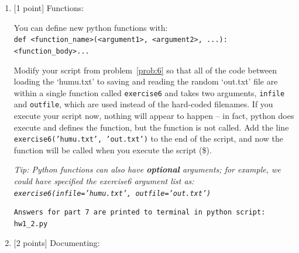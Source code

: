 \documentclass[10pt]{article}
\begin{document}
\begin{enumerate}
Also plot the original {\tt walk.txt} and your scaled version {\tt walk\_scale01.txt}.  To plot you can use the following very simple function that uses the matplotlib plot function:
\begin{verbatim}
import matplotlib.pyplot as plt

def plot_1d_array(arr):
    plt.figure()
    plt.plot(arr)
\end{verbatim}
Include these two plots, with appropriate captions, in your results (\$).

{\em Note: the shapes of the original {\tt walk.txt} and {\tt walk\_scale01.txt} should be identical, but the y-axis ranges should reflect the original and scaled ranges.}

{\bf Solution.} 

Answers for part 6 are printed to terminal in python script: hw1.py


\item \label{prob:7} [1 point]
Functions:

You can define new python functions with:\\
\hspace*{1cm} {\tt def <function\_name>(<argument1>, <argument2>, ...):}\\
\hspace*{1cm}\hspace{2em} {\tt <function\_body>...}

Modify your script from problem~\ref{prob:6} so that all of the code between loading the `humu.txt' to saving and reading the random `out.txt' file are within a single function called {\tt exercise6} and takes two arguments, {\tt infile} and {\tt outfile}, which are used instead of the hard-coded filenames.  If you execute your script now, nothing will appear to happen -- in fact, python does execute and defines the function, but the function is not called.  Add the line {\tt exercise6('humu.txt', 'out.txt')} to the end of the script, and now the function will be called when you execute the script (\$).

{\em Tip: Python functions can also have {\bf optional} arguments; for example, we could have specified the exercise6 argument list as: {\tt exercise6(infile='humu.txt', outfile='out.txt')}}

\begin{verbatim}
Answers for part 7 are printed to terminal in python script: hw1_2.py
\end{verbatim}

\item \label{prob:8} [2 points]
Documenting:


\end{enumerate}
\end{document}
